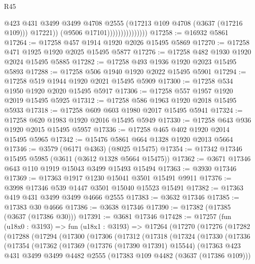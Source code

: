 \begin{lexlean}{R45}
\begin{coremodule}
                                    @423
                                    @431
                                    @3499
                                    @3499
                                    @4708
                                    @2555
                                    (@17213 @109 @4708 (@3637 (@17216 @109)))
                                    @17221))
                                (@9506 @17101)))))))))))))))
@17258 := @16932 @5861
@17264 := @17258 @457 @1914 @1920 @2026 @15495 @5869
@17270 := @17258 @471 @1925 @1920 @2025 @15495 @5877
@17276 := @17258 @482 @1930 @1920 @2024 @15495 @5885
@17282 := @17258 @493 @1936 @1920 @2023 @15495 @5893
@17288 := @17258 @506 @1940 @1920 @2022 @15495 @5901
@17294 := @17258 @519 @1944 @1920 @2021 @15495 @5909
@17300 := @17258 @534 @1950 @1920 @2020 @15495 @5917
@17306 := @17258 @557 @1957 @1920 @2019 @15495 @5925
@17312 := @17258 @586 @1963 @1920 @2018 @15495 @5933
@17318 := @17258 @609 @603 @1980 @2017 @15495 @5941
@17324 := @17258 @620 @1983 @1920 @2016 @15495 @5949
@17330 := @17258 @643 @936 @1920 @2015 @15495 @5957
@17336 := @17258 @465 @402 @1920 @2014 @15495 @5965
@17342 := @15476 @5861 @664 @1328 @1920 @2013 @5664
@17346 := @3579 (@6171 @4363) (@8025 @15475)
@17354 := @17342 @17346 @15495 @5985 (@3611 (@3612 @1328 @5664 @15475))
@17362 := @3671 @17346 @643 @110 @1919 @15043 @3499 @15493 @15494
@17363 := @3930 @17346
@17369 := @17363 @1917 @1230 @15041 @3501 @15491 @9911
@17376 := @3998 @17346 @539 @1447 @3501 @15040 @15523 @15491
@17382 := @17363 @419 @431 @3499 @3499 @4666 @2555
@17383 := @3632 @17346
@17385 := @17383 @30 @4666
@17386 := @3638 @17346
@17390 := @17382 (@17385 (@3637 (@17386 @30)))
@17391 := @3681 @17346
@17428 := @17257
    (fun (u18x0 : @3193) =>
    fun (u18x1 : @3193) =>
    @17264
      (@17270
        (@17276
          (@17282
            (@17288
              (@17294
                (@17300
                  (@17306
                    (@17312
                      (@17318
                        (@17324
                          (@17330
                            (@17336
                              (@17354
                                (@17362
                                  (@17369
                                    (@17376 (@17390 @17391) @15544)
                                    (@17363
                                      @423
                                      @431
                                      @3499
                                      @3499
                                      @4482
                                      @2555
                                      (@17383 @109 @4482 (@3637 (@17386 @109)))

\end{coremodule}
\end{lexlean}
